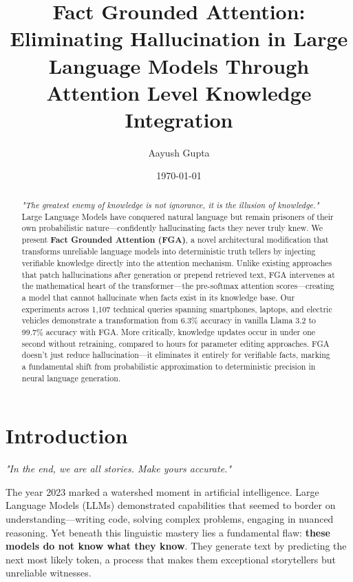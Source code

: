 \documentclass[11pt, a4paper]{article}
\title{\textbf{Fact Grounded Attention: \\ Eliminating Hallucination in Large Language Models Through \\ Attention Level Knowledge Integration}}
\author{
Aayush Gupta \\
}
\date{\today}
\theoremstyle{definition}
\begin{document}
\maketitle

\thispagestyle{fancy}
\renewcommand{\headrulewidth}{0pt} %
\renewcommand{\footrulewidth}{0.4pt} %
\fancyhead{} %

\begin{abstract}
\textit{"The greatest enemy of knowledge is not ignorance, it is the illusion of knowledge."} Large Language Models have conquered natural language but remain prisoners of their own probabilistic nature—confidently hallucinating facts they never truly knew. We present \textbf{Fact Grounded Attention (FGA)}, a novel architectural modification that transforms unreliable language models into deterministic truth tellers by injecting verifiable knowledge directly into the attention mechanism. Unlike existing approaches that patch hallucinations after generation or prepend retrieved text, FGA intervenes at the mathematical heart of the transformer—the pre-softmax attention scores—creating a model that cannot hallucinate when facts exist in its knowledge base. Our experiments across 1,107 technical queries spanning smartphones, laptops, and electric vehicles demonstrate a transformation from 6.3\% accuracy in vanilla Llama 3.2 to 99.7\% accuracy with FGA. More critically, knowledge updates occur in under one second without retraining, compared to hours for parameter editing approaches. FGA doesn't just reduce hallucination—it eliminates it entirely for verifiable facts, marking a fundamental shift from probabilistic approximation to deterministic precision in neural language generation.
\end{abstract}

\section{Introduction}
\pagestyle{plain} %

\textit{"In the end, we are all stories. Make yours accurate."}

The year 2023 marked a watershed moment in artificial intelligence. Large Language Models (LLMs) demonstrated capabilities that seemed to border on understanding—writing code, solving complex problems, engaging in nuanced reasoning. Yet beneath this linguistic mastery lies a fundamental flaw: \textbf{these models do not know what they know}. They generate text by predicting the next most likely token, a process that makes them exceptional storytellers but unreliable witnesses.
\end{document}
